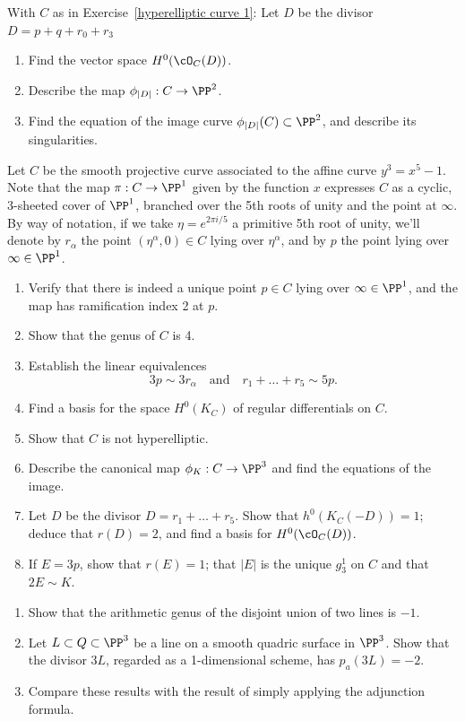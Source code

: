\begin{exercise}
With $C$ as in Exercise~\ref{hyperelliptic curve 1}:
Let $D$ be the divisor $D = p + q + r_0 + r_3$
\begin{enumerate}
\item Find the vector space $H^0(\cO_C(D))$.
\item Describe the map $\phi_{|D|} : C \to \PP^2$.
\item Find the equation of the image curve $\phi_{|D|}(C) \subset \PP^2$, and describe its singularities.
\end{enumerate}
\end{exercise}
 
\begin{exercise}
Let $C$ be the smooth projective curve associated to the affine curve $y^3 = x^5 -1$. Note that the map $\pi : C \to \PP^1$ given by the function $x$ expresses $C$ as a cyclic, 3-sheeted cover of $\PP^1$, branched over the 5th roots of unity and the point at $\infty$. By way of notation, if we take $\eta = e^{2\pi i/5}$ a primitive 5th root of unity, we'll denote by $r_\alpha$ the point $(\eta^\alpha, 0) \in C$ lying over $\eta^\alpha$, and by $p$ the point lying over $\infty \in \PP^1$.

\begin{enumerate}
\item Verify that there is indeed a unique point $p \in C$ lying over $\infty \in \PP^1$, and the map has ramification index 2 at $p$. 
\item Show that the genus of $C$ is 4.
\item Establish the linear equivalences
$$
3p \sim 3r_\alpha \quad \text{and} \quad r_1+ \dots + r_5 \sim 5p.
$$
\item Find a basis for the space $H^0(K_C)$ of regular differentials on $C$.
\item Show that $C$ is not hyperelliptic.
\item Describe the canonical map $\phi_K : C \to \PP^3$ and find the equations of the image.
\item Let $D$ be the divisor $D = r_1+\dots+r_5$. Show that $h^0(K_C(-D)) = 1$; deduce that $r(D) = 2$, and find a basis for $H^0(\cO_C(D))$.
\item If $E = 3p$, show that $r(E) = 1$; that $|E|$ is the unique $g^1_3$ on $C$ and that $2E \sim K$.
\end{enumerate}
\end{exercise}


\begin{exercise}\label{pa example}
\begin{enumerate}
 \item Show that the arithmetic genus of the disjoint union of two lines is $-1$.
\item Let $L\subset Q\subset \PP^3$ be a line on a smooth quadric surface in $\PP^3$. Show that the 
divisor $3L$, regarded as a 1-dimensional scheme, has $p_a(3L) = -2$.
\item Compare these results with the result of simply applying the adjunction formula.
\end{enumerate}
\end{exercise}

